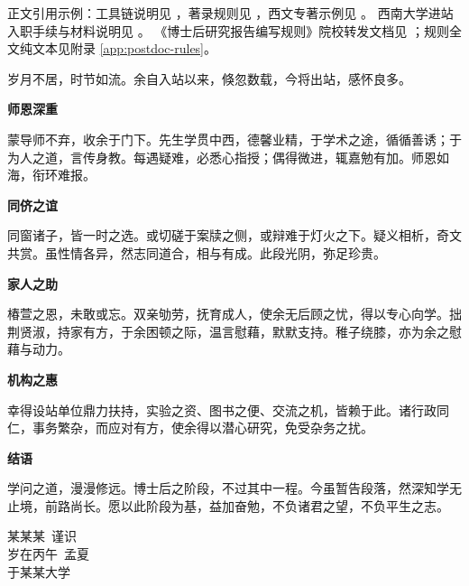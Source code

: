 \begingroup\sloppy
\noindent 正文引用示例：工具链说明见 \cite{ctex2022}，著录规则见 \cite{gbt7714}，西文专著示例见 \cite{knuth1984texbook}。
西南大学进站入职手续与材料说明见 \cite{swufe2025postdocworkflow}。
《博士后研究报告编写规则》院校转发文档见 \cite{tsinghua2021postdocrulesdoc}；规则全文纯文本见附录 \ref{app:postdoc-rules}。\par
\endgroup

\begin{ack}
岁月不居，时节如流。余自入站以来，倏忽数载，今将出站，感怀良多。

\par\medskip
{\centering\bfseries 师恩深重\par}
\medskip

蒙导师不弃，收余于门下。先生学贯中西，德馨业精，于学术之途，循循善诱；于为人之道，言传身教。每遇疑难，必悉心指授；偶得微进，辄嘉勉有加。师恩如海，衔环难报。

\par\medskip
{\centering\bfseries 同侪之谊\par}
\medskip

同窗诸子，皆一时之选。或切磋于案牍之侧，或辩难于灯火之下。疑义相析，奇文共赏。虽性情各异，然志同道合，相与有成。此段光阴，弥足珍贵。

\par\medskip
{\centering\bfseries 家人之助\par}
\medskip

椿萱之恩，未敢或忘。双亲劬劳，抚育成人，使余无后顾之忧，得以专心向学。拙荆贤淑，持家有方，于余困顿之际，温言慰藉，默默支持。稚子绕膝，亦为余之慰藉与动力。

\par\medskip
{\centering\bfseries 机构之惠\par}
\medskip

幸得设站单位鼎力扶持，实验之资、图书之便、交流之机，皆赖于此。诸行政同仁，事务繁杂，而应对有方，使余得以潜心研究，免受杂务之扰。

\par\medskip
{\centering\bfseries 结语\par}
\medskip

学问之道，漫漫修远。博士后之阶段，不过其中一程。今虽暂告段落，然深知学无止境，前路尚长。愿以此阶段为基，益加奋勉，不负诸君之望，不负平生之志。

\vspace{2em}

\begin{flushright}
    某某某\ 谨识\\
    岁在丙午\ 孟夏\\
    于某某大学
\end{flushright}
\end{ack}

